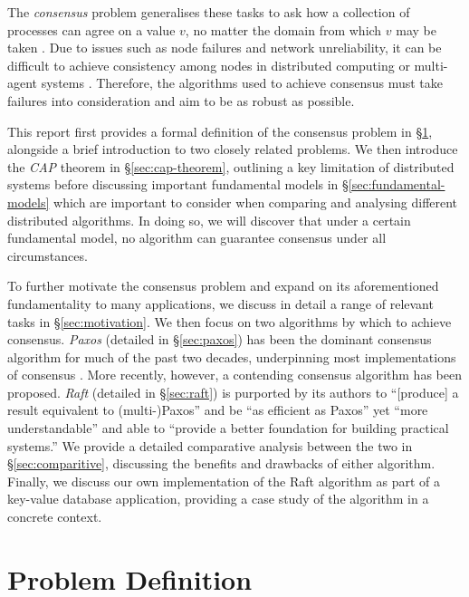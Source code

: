\documentclass[12pt, a4paper]{article}
\begin{document}
The \textit{consensus} problem generalises these tasks to ask how a collection
of processes can agree on a value $v$, no matter the domain from which $v$ may
be taken \cite{coulouris2005distributed}. Due to issues such as node failures
and network unreliability, it can be difficult to achieve consistency among
nodes in distributed computing or multi-agent systems
\cite{coulouris2005distributed}. Therefore, the algorithms used to achieve
consensus must take failures into consideration and aim to be as robust as
possible.

This report first provides a formal definition of the consensus problem in
\S\ref{sec:consensus-def}, alongside a brief introduction to two closely related
problems. We then introduce the \textit{CAP} theorem in \S\ref{sec:cap-theorem},
outlining a key limitation of distributed systems before discussing important
fundamental models in \S\ref{sec:fundamental-models} which are important to
consider when comparing and analysing different distributed algorithms. In doing
so, we will discover that under a certain fundamental model, no algorithm can
guarantee consensus under all circumstances.

To further motivate the consensus problem and expand on its aforementioned
fundamentality to many applications, we discuss in detail a range of relevant
tasks in \S\ref{sec:motivation}. We then focus on two algorithms by which
to achieve consensus. \textit{Paxos} \cite{lamport1998part, lamport2001paxos}
(detailed in \S\ref{sec:paxos}) has been the dominant consensus algorithm for
much of the past two decades, underpinning most implementations of consensus
\cite{ongaro2014search}. More recently, however, a contending consensus
algorithm has been proposed. \textit{Raft} \cite{ongaro2014search} (detailed in
\S\ref{sec:raft}) is purported by its authors to ``[produce] a result equivalent
to (multi-)Paxos'' and be ``as efficient as Paxos'' yet ``more understandable''
and able to ``provide a better foundation for building practical systems.''
\cite{ongaro2014search} We provide a detailed comparative analysis between the
two in \S\ref{sec:comparitive}, discussing the benefits and drawbacks of either
algorithm. Finally, we discuss our own implementation of the
Raft algorithm as part of a key-value database
application, providing a case study of the algorithm in a concrete context.


\section{Problem Definition} \label{sec:consensus-def}
\end{document}

